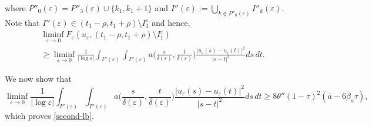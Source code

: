 \documentclass[12pt]{article}
\numberwithin{equation}{section}
\def\e{\varepsilon}
\begin{document}
 where $P''_{0}(\e)=P''_{3}(\e)\cup\{k_{1},k_{1}+1\}$ and $I''(\e):=\bigcup_{k\notin P''_{0}(\e)}I''_{k}(\e)$. Note that $I''(\e)\in(t_1-\rho,t_1+\rho)\setminus I^{\e}_1$ and hence,
\begin{multline*}\liminf_{\varepsilon\to0}F_{\varepsilon}(u_{\varepsilon},(t_{1}-\rho,t_{1}+\rho)\setminus I^\e_1)\\\ge\liminf_{\e\to0}\frac{1}{\left|\log{\e}\right|}\int_{I''(\varepsilon)}\int_{I''(\e)}a\big(\frac{s}{\delta(\e) },\frac{t}{\delta(\e) }\big)\frac{\left|u_{\e}(s)-u_{\e}(t)\right|^2}{\left|s-t\right|^2}ds\,dt.
\end{multline*}

 We now show that 
 \begin{equation}\label{liminf average term}
     \liminf_{\varepsilon\to0}\frac{1}{\left|\log{\varepsilon}\right|}\int_{I''(\e)}\int_{I''(\e)}a\Big(\frac{s}{\delta(\e) },\frac{t}{\delta(\e) }\Big)\frac{\left|u_{\varepsilon}(s)-u_{\varepsilon}(t)\right|^2}{\left|s-t\right|^2}ds\,dt\ge8\theta''(1-\tau)^{2}(\bar{a}-6\beta_{a}\tau),
 \end{equation}
 which proves \eqref{second-lb}. 
 
\end{document}
